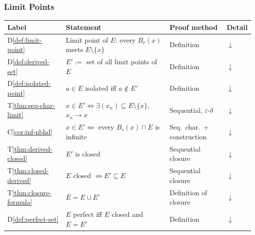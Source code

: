 \subsubsection{Limit Points}
\label{sec:limit-points}

\begin{tcolorbox}[colback=gray!6, colframe=gray!40, arc=2pt,
  left=6pt, right=6pt, top=4pt, bottom=4pt,
  title={\small\textbf{Limit Points --- Quick Reference}},
  fonttitle=\small\bfseries]
\small
\begin{tabular}{l l l l}
\toprule
\textbf{Label} & \textbf{Statement} & \textbf{Proof method} & \textbf{Detail} \\
\midrule
D\ref{def:limit-point}    & Limit point of $E$: every $B_r(x)$ meets $E\setminus\{x\}$        & Definition             & \hyperref[def:limit-point]{$\downarrow$} \\
D\ref{def:derived-set}    & $E' :=$ set of all limit points of $E$                            & Definition             & \hyperref[def:derived-set]{$\downarrow$} \\
D\ref{def:isolated-point} & $a\in E$ isolated iff $a\notin E'$                                & Definition             & \hyperref[def:isolated-point]{$\downarrow$} \\
T\ref{thm:seq-char-limit} & $x\in E' \iff \exists(x_n)\subseteq E\setminus\{x\}$, $x_n\to x$ & Sequential, $\varepsilon$-$\delta$ & \hyperref[thm:seq-char-limit]{$\downarrow$} \\
C\ref{cor:inf-nbhd}       & $x\in E' \iff$ every $B_r(x)\cap E$ is infinite                  & Seq.\ char.\ + construction & \hyperref[cor:inf-nbhd]{$\downarrow$} \\
T\ref{thm:derived-closed} & $E'$ is closed                                                    & Sequential closure     & \hyperref[thm:derived-closed]{$\downarrow$} \\
T\ref{thm:closed-derived} & $E$ closed $\iff E'\subseteq E$                                   & Sequential closure     & \hyperref[thm:closed-derived]{$\downarrow$} \\
T\ref{thm:closure-formula}& $\overline{E} = E\cup E'$                                         & Definition of closure  & \hyperref[thm:closure-formula]{$\downarrow$} \\
D\ref{def:perfect-set}    & $E$ perfect iff $E$ closed and $E=E'$                             & Definition             & \hyperref[def:perfect-set]{$\downarrow$} \\
\bottomrule
\end{tabular}
\end{tcolorbox}

